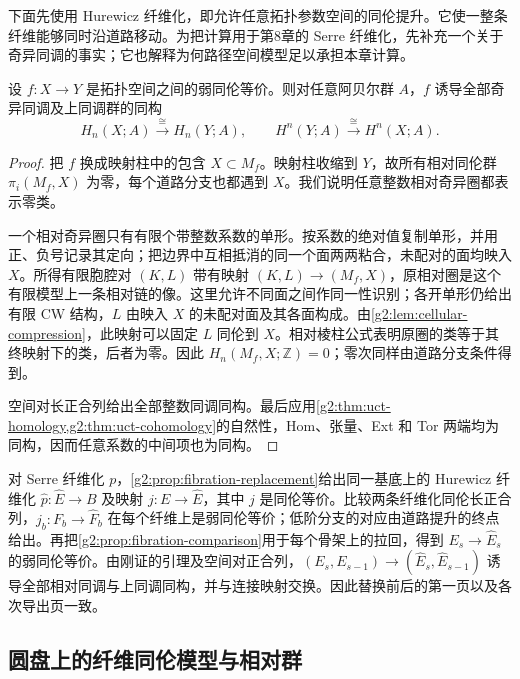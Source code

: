 \ProseParagraphBreak

下面先使用 Hurewicz 纤维化，即允许任意拓扑参数空间的同伦提升。它使一整条纤维能够同时沿道路移动。为把计算用于第8章的 Serre 纤维化，先补充一个关于奇异同调的事实；它也解释为何路径空间模型足以承担本章计算。

\begin{lemma}\label{g2:lem:weak-equivalence-homology}
	设 \(f:X\to Y\) 是拓扑空间之间的弱同伦等价。则对任意阿贝尔群 \(A\)，\(f\) 诱导全部奇异同调及上同调群的同构
	\[
		H_n(X;A)\xrightarrow{\cong}H_n(Y;A),\qquad
		H^n(Y;A)\xrightarrow{\cong}H^n(X;A).
	\]
\end{lemma}
\begin{proof}
	把 \(f\) 换成映射柱中的包含 \(X\subset M_f\)。映射柱收缩到 \(Y\)，故所有相对同伦群 \(\pi_i(M_f,X)\) 为零，每个道路分支也都遇到 \(X\)。我们说明任意整数相对奇异圈都表示零类。

	一个相对奇异圈只有有限个带整数系数的单形。按系数的绝对值复制单形，并用正、负号记录其定向；把边界中互相抵消的同一个面两两粘合，未配对的面均映入 \(X\)。所得有限胞腔对 \((K,L)\) 带有映射 \((K,L)\to(M_f,X)\)，原相对圈是这个有限模型上一条相对链的像。这里允许不同面之间作同一性识别；各开单形仍给出有限 CW 结构，\(L\) 由映入 \(X\) 的未配对面及其各面构成。由\cref{g2:lem:cellular-compression}，此映射可以固定 \(L\) 同伦到 \(X\)。相对棱柱公式表明原圈的类等于其终映射下的类，后者为零。因此 \(H_n(M_f,X;\mathbb Z)=0\)；零次同样由道路分支条件得到。

	空间对长正合列给出全部整数同调同构。最后应用\cref{g2:thm:uct-homology,g2:thm:uct-cohomology}的自然性，Hom、张量、Ext 和 Tor 两端均为同构，因而任意系数的中间项也为同构。
\end{proof}

对 Serre 纤维化 \(p\)，\cref{g2:prop:fibration-replacement}给出同一基底上的 Hurewicz 纤维化 \(\widehat p:\widehat E\to B\) 及映射 \(j:E\to\widehat E\)，其中 \(j\) 是同伦等价。比较两条纤维化同伦长正合列，\(j_b:F_b\to\widehat F_b\) 在每个纤维上是弱同伦等价；低阶分支的对应由道路提升的终点给出。再把\cref{g2:prop:fibration-comparison}用于每个骨架上的拉回，得到 \(E_s\to\widehat E_s\) 的弱同伦等价。由刚证的引理及空间对正合列，\((E_s,E_{s-1})\to(\widehat E_s,\widehat E_{s-1})\) 诱导全部相对同调与上同调同构，并与连接映射交换。因此替换前后的第一页以及各次导出页一致。

\subsection{圆盘上的纤维同伦模型与相对群}
\label{g2:subsec:1101:02}

